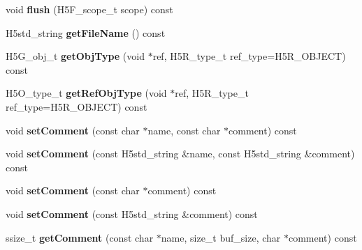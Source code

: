 \begin{DoxyCompactItemize}
\item 
\mbox{\label{class_h5_1_1_h5_location_a9aff2dcb1b3903f5e3194aa223b724ac}} 
void {\bfseries flush} (H5\+F\+\_\+scope\+\_\+t scope) const
\item 
\mbox{\label{class_h5_1_1_h5_location_a34592dfe7d753a2fc1af2986a452007e}} 
H5std\+\_\+string {\bfseries get\+File\+Name} () const
\item 
\mbox{\label{class_h5_1_1_h5_location_a7d7779a82e345180f2a39042882fab5a}} 
H5\+G\+\_\+obj\+\_\+t {\bfseries get\+Obj\+Type} (void $\ast$ref, H5\+R\+\_\+type\+\_\+t ref\+\_\+type=H5\+R\+\_\+\+O\+B\+J\+E\+CT) const
\item 
\mbox{\label{class_h5_1_1_h5_location_a06704fce2de49d9c88409dbd0d8efb90}} 
H5\+O\+\_\+type\+\_\+t {\bfseries get\+Ref\+Obj\+Type} (void $\ast$ref, H5\+R\+\_\+type\+\_\+t ref\+\_\+type=H5\+R\+\_\+\+O\+B\+J\+E\+CT) const
\item 
\mbox{\label{class_h5_1_1_h5_location_a7864d2e28fc4053c35d7c20af748d39b}} 
void {\bfseries set\+Comment} (const char $\ast$name, const char $\ast$comment) const
\item 
\mbox{\label{class_h5_1_1_h5_location_a2b886d9b49814c1cb09b884c0b87fc7b}} 
void {\bfseries set\+Comment} (const H5std\+\_\+string \&name, const H5std\+\_\+string \&comment) const
\item 
\mbox{\label{class_h5_1_1_h5_location_a209188b072357682772182027904504a}} 
void {\bfseries set\+Comment} (const char $\ast$comment) const
\item 
\mbox{\label{class_h5_1_1_h5_location_aead4e9a2dae70855b46b3f2720db0040}} 
void {\bfseries set\+Comment} (const H5std\+\_\+string \&comment) const
\item 
\mbox{\label{class_h5_1_1_h5_location_a55e9f22742e9fbacf97059c68c7a638c}} 
ssize\+\_\+t {\bfseries get\+Comment} (const char $\ast$name, size\+\_\+t buf\+\_\+size, char $\ast$comment) const
\item 

\end{DoxyCompactItemize}
